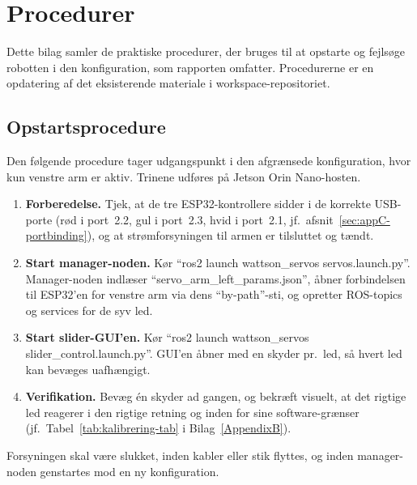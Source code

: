 
\chapter{Procedurer}
\label{AppendixD}

Dette bilag samler de praktiske procedurer, der bruges til at
opstarte og fejlsøge robotten i den konfiguration, som rapporten
omfatter. Procedurerne er en opdatering af det eksisterende
materiale i workspace-repositoriet.

\section{Opstartsprocedure}
\label{sec:appC-opstart}

Den følgende procedure tager udgangspunkt i den afgrænsede
konfiguration, hvor kun venstre arm er aktiv. Trinene udføres på
Jetson Orin Nano-hosten.

\begin{enumerate}
    \item \textbf{Forberedelse.} Tjek, at de tre ESP32-kontrollere
        sidder i de korrekte USB-porte (rød i port~2.2, gul i
        port~2.3, hvid i port~2.1, jf.~afsnit~\ref{sec:appC-portbinding}),
        og at strømforsyningen til armen er tilsluttet og tændt.
    \item \textbf{Start manager-noden.} Kør
        \enquote{ros2 launch wattson\_servos servos.launch.py}.
        Manager-noden indlæser
        \enquote{servo\_arm\_left\_params.json}, åbner forbindelsen
        til ESP32'en for venstre arm via dens \enquote{by-path}-sti,
        og opretter ROS-topics og services for de syv led.
    \item \textbf{Start slider-GUI'en.} Kør
        \enquote{ros2 launch wattson\_servos slider\_control.launch.py}.
        GUI'en åbner med en skyder pr.~led, så hvert led kan
        bevæges uafhængigt.
    \item \textbf{Verifikation.} Bevæg én skyder ad gangen, og
        bekræft visuelt, at det rigtige led reagerer i den rigtige
        retning og inden for sine software-grænser
        (jf.~Tabel~\ref{tab:kalibrering-tab} i
        Bilag~\ref{AppendixB}).
\end{enumerate}

Forsyningen skal være slukket, inden kabler eller stik flyttes,
og inden manager-noden genstartes mod en ny konfiguration.

